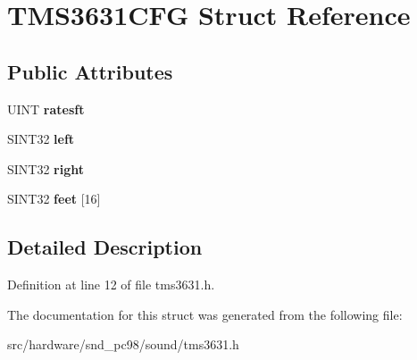 \hypertarget{structTMS3631CFG}{\section{T\-M\-S3631\-C\-F\-G Struct Reference}
\label{structTMS3631CFG}
}
\subsection*{Public Attributes}
\begin{DoxyCompactItemize}
\item 
\hypertarget{structTMS3631CFG_a0bdf36e352d0b57d2e6607d73e0a28a1}{U\-I\-N\-T {\bfseries ratesft}}\label{structTMS3631CFG_a0bdf36e352d0b57d2e6607d73e0a28a1}

\item 
\hypertarget{structTMS3631CFG_a64e4b146f7c7ef56b395003fddc96c9d}{S\-I\-N\-T32 {\bfseries left}}\label{structTMS3631CFG_a64e4b146f7c7ef56b395003fddc96c9d}

\item 
\hypertarget{structTMS3631CFG_afa1d0a70ebf891063567d21f44fda581}{S\-I\-N\-T32 {\bfseries right}}\label{structTMS3631CFG_afa1d0a70ebf891063567d21f44fda581}

\item 
\hypertarget{structTMS3631CFG_a32194f3ac3cf7ac991e0ef7ac821e161}{S\-I\-N\-T32 {\bfseries feet} \mbox{[}16\mbox{]}}\label{structTMS3631CFG_a32194f3ac3cf7ac991e0ef7ac821e161}

\end{DoxyCompactItemize}


\subsection{Detailed Description}


Definition at line 12 of file tms3631.\-h.



The documentation for this struct was generated from the following file\-:\begin{DoxyCompactItemize}
\item 
src/hardware/snd\-\_\-pc98/sound/tms3631.\-h\end{DoxyCompactItemize}

